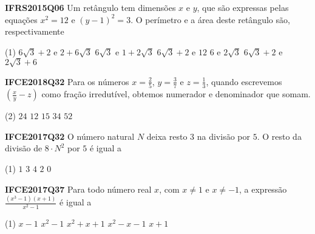 \documentclass[fleqn,10pt]{article}
\begin{document}
\begin{multicols}{2}
\setlength\columnseprule{1pt}
\def\columnseprulecolor{\color{corlinha}}%

\begin{question}[name = Questão]
\textbf{IFRS2015Q06}
Um retângulo tem dimensões \( x \) e \( y \), que são expressas pelas equações \( x^2=12\) e \( (y-1)^2=3\). O perímetro e a área deste retângulo são, respectivamente

\begin{tasks}(1)
        \task \( 6\sqrt{3} + 2 \) e \( 2 + 6\sqrt{3} \)
        \task \( 6\sqrt{3}\) e \( 1 + 2\sqrt{3} \)
        \task \( 6\sqrt{3} +2 \) e \( 12 \)
        \task \( 6 \) e \( 2\sqrt{3} \)
        \task \( 6\sqrt{3} + 2 \) e \( 2\sqrt{3} + 6 \)
    \end{tasks}
\end{question}

\begin{question}[name = Questão]
\textbf{IFCE2018Q32}
Para os números \( x=\frac{2}{5} \), \( y= \frac{3}{7} \) e \( z= \frac{1}{3} \), quando escrevemos \( \left( \frac{x}{y} - z \right) \) como fração irredutível, obtemos numerador e denominador que somam.

\begin{tasks}(2)
        \task \( 24 \)
        \task \( 12 \)
        \task \( 15 \)
        \task \( 34 \)
        \task \( 52 \)
    \end{tasks}
\end{question}

\begin{question}[name = Questão]
\textbf{IFCE2017Q32}
O número natural \( N \) deixa resto \( 3 \) na divisão por \( 5 \). O resto da divisão de \(8\cdot N^2\) por \( 5 \) é igual a

\begin{tasks}(1)
        \task \( 1 \)
        \task \( 3 \)
        \task \( 4 \)
        \task \( 2 \)
        \task \( 0 \)
    \end{tasks}
\end{question}

\begin{question}[name = Questão]
\textbf{IFCE2017Q37}
Para todo número real \( x \), com \( x \neq 1\) e \( x \neq -1\), a expressão \( \frac{(x^3-1)(x+1)}{x^2-1} \) é igual a

\begin{tasks}(1)
        \task \( x-1 \)  
        \task \( x^2-1 \)  
        \task \( x^2+x+1 \)  
        \task \( x^2-x-1 \)  
        \task \( x+1 \)  
    \end{tasks}
\end{question}


\end{multicols}
\end{document}
